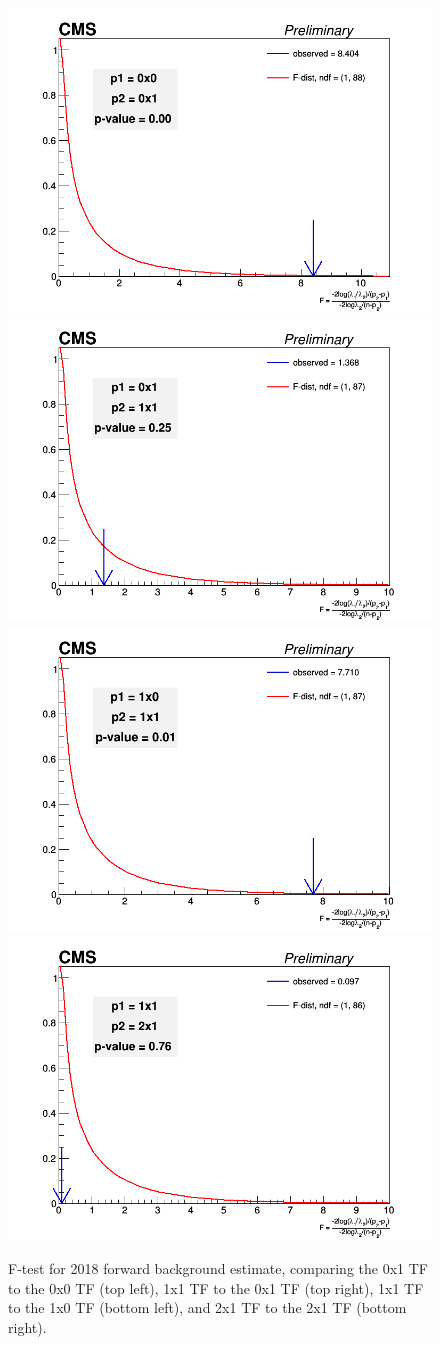             \begin{figure}[!htbp]
                \begin{center}
                \includegraphics[width=0.4\linewidth]{Plots/tests/ftest_fwd_0x0_vs_0x1_2018.png}
                \includegraphics[width=0.4\linewidth]{Plots/tests/ftest_fwd_0x1_vs_1x1_2018.png}
                \includegraphics[width=0.4\linewidth]{Plots/tests/ftest_fwd_1x0_vs_1x1_2018.png}
                \includegraphics[width=0.4\linewidth]{Plots/tests/ftest_fwd_1x1_vs_2x1_2018.png}
    
                    \caption{F-test for 2018 forward background estimate, comparing the 0x1 TF to the 0x0 TF (top left), 1x1 TF to the 0x1 TF (top right), 1x1 TF to the 1x0 TF (bottom left), and 2x1 TF to the 2x1 TF (bottom right).}
                    \label{fig:ftest18}
                \end{center}
            \end{figure}
   
